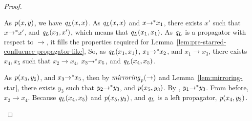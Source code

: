 \documentclass[numbers,10pt,preprint\ifanon ,nocopyrightspace\fi]{sigplanconf}
\begin{document}
\begin{proof}
\begin{case}[\TransitivityRule{}]
    As $\mathit{p}(x,y)$, we have $\mathit{q}_L(x,x)$.
    As $\mathit{q}_L(x,x)$ and $x {\rightarrow}^* x_1$, there exists $x'$
    such that $x {\rightarrow}^* x'$, and $\mathit{q}_L(x_1,x')$, which
    means that $\mathit{q}_L(x_1,x_1)$.
    As $\mathit{q}_L$ is a propagator with respect to $\rightarrow$,
    it fills the properties required for
    Lemma~\ref{lem:pre-starred-confluence-propagator-like}, 
    So, as $\mathit{q}_L(x_1,x_1)$, $x_1 {\rightarrow}^* x_2$, and
    $x_1 \rightarrow x_3$, there exists $x_4,x_5$ such that $x_2 \rightarrow
    x_4$, $x_3 {\rightarrow}^* x_5$, and $\mathit{q}_L(x_4,x_5)$.

    As $\mathit{p}(x_3,y_2)$, and $x_3 {\rightarrow}^* x_5$, then by
    $\mathit{mirroring}_{\mathit{p}}(\rightarrow)$ and
    Lemma~\ref{lem:mirroring-star}, there exists $y_3$ such that
    $y_2 {\rightarrow}^* y_3$, and $\mathit{p}(x_5,y_3)$.
    By \TransitivityRule{}, $y_1 {\rightarrow}^* y_3$.
    From before, $x_2 \rightarrow x_4$.
    Because
    $\mathit{q}_L(x_4,x_5)$ and $\mathit{p}(x_5,y_3)$, and
    $\mathit{q}_L$ is a left propagator, $\mathit{p}(x_4,y_3)$.
  \end{case}
\end{proof}
\end{document}

